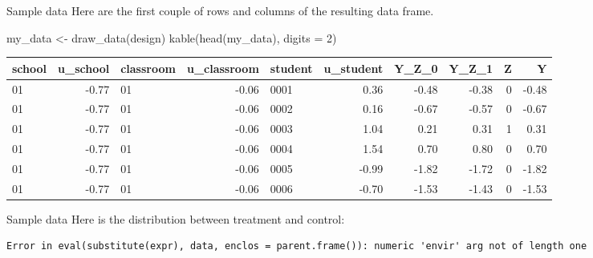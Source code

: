 \documentclass[
  11pt,
  ignorenonframetext,
]{beamer}
\newenvironment{Shaded}{\begin{snugshade}}{\end{snugshade}}
\newcommand{\AttributeTok}[1]{\textcolor[rgb]{0.40,0.45,0.13}{#1}}
\newcommand{\DecValTok}[1]{\textcolor[rgb]{0.68,0.00,0.00}{#1}}
\newcommand{\FunctionTok}[1]{\textcolor[rgb]{0.28,0.35,0.67}{#1}}
\newcommand{\NormalTok}[1]{\textcolor[rgb]{0.00,0.23,0.31}{#1}}
\newcommand{\OtherTok}[1]{\textcolor[rgb]{0.00,0.23,0.31}{#1}}
\newcommand{\SpecialCharTok}[1]{\textcolor[rgb]{0.37,0.37,0.37}{#1}}
\newcommand{\StringTok}[1]{\textcolor[rgb]{0.13,0.47,0.30}{#1}}
\begin{document}
\begin{frame}[fragile]{Sample data \label{simpleAass}}
\protect\hypertarget{sample-data}{}
Here are the first couple of rows and columns of the resulting data
frame.

\begin{Shaded}
\begin{Highlighting}[]
\NormalTok{my\_data }\OtherTok{\textless{}{-}} \FunctionTok{draw\_data}\NormalTok{(design)}
\FunctionTok{kable}\NormalTok{(}\FunctionTok{head}\NormalTok{(my\_data), }\AttributeTok{digits =} \DecValTok{2}\NormalTok{)}
\end{Highlighting}
\end{Shaded}

\begin{tabular}{l|r|l|r|l|r|r|r|r|r}
\hline
school & u\_school & classroom & u\_classroom & student & u\_student & Y\_Z\_0 & Y\_Z\_1 & Z & Y\\
\hline
01 & -0.77 & 01 & -0.06 & 0001 & 0.36 & -0.48 & -0.38 & 0 & -0.48\\
\hline
01 & -0.77 & 01 & -0.06 & 0002 & 0.16 & -0.67 & -0.57 & 0 & -0.67\\
\hline
01 & -0.77 & 01 & -0.06 & 0003 & 1.04 & 0.21 & 0.31 & 1 & 0.31\\
\hline
01 & -0.77 & 01 & -0.06 & 0004 & 1.54 & 0.70 & 0.80 & 0 & 0.70\\
\hline
01 & -0.77 & 01 & -0.06 & 0005 & -0.99 & -1.82 & -1.72 & 0 & -1.82\\
\hline
01 & -0.77 & 01 & -0.06 & 0006 & -0.70 & -1.53 & -1.43 & 0 & -1.53\\
\hline
\end{tabular}
\end{frame}

\begin{frame}[fragile]{Sample data}
\protect\hypertarget{sample-data-1}{}
Here is the distribution between treatment and control:

\begin{Shaded}
\end{Shaded}

\begin{verbatim}
Error in eval(substitute(expr), data, enclos = parent.frame()): numeric 'envir' arg not of length one
\end{verbatim}
\end{frame}
\end{document}
